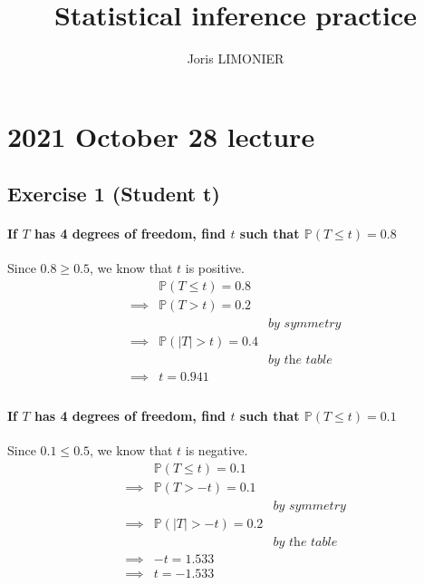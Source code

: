 \documentclass{article}
\title{Statistical inference practice}
\author{Joris LIMONIER}
\renewcommand{\P}{\mathbb{P}}
\begin{document}
\maketitle

\tableofcontents

\section{2021 October 28 lecture}
\subsection{Exercise 1 (Student t)}
\paragraph{If \(T\) has 4 degrees of freedom, find \(t\) such that \(\P (T \leq t) = 0.8\)\\}
Since \(0.8 \geq 0.5\), we know that \(t\) is positive.
\begin{align*}
           & \P (T \leq t) = 0.8                         \\
  \implies & \P (T > t) = 0.2                            \\
           &                     & \textit{by symmetry}  \\
  \implies & \P (|T| > t) = 0.4                          \\
           &                     & \textit{by the table} \\
  \implies & t = 0.941                                   \\
\end{align*}
\paragraph{If \(T\) has 4 degrees of freedom, find \(t\) such that \(\P (T \leq t) = 0.1\)\\}
Since \(0.1 \leq 0.5\), we know that \(t\) is negative.
\begin{align*}
           & \P (T \leq t) = 0.1                         \\
  \implies & \P (T > -t) = 0.1                           \\
           &                     & \textit{by symmetry}  \\
  \implies & \P (|T| > -t) = 0.2                         \\
           &                     & \textit{by the table} \\
  \implies & -t = 1.533                                  \\
  \implies & t = -1.533                                  \\
\end{align*}
\end{document}

